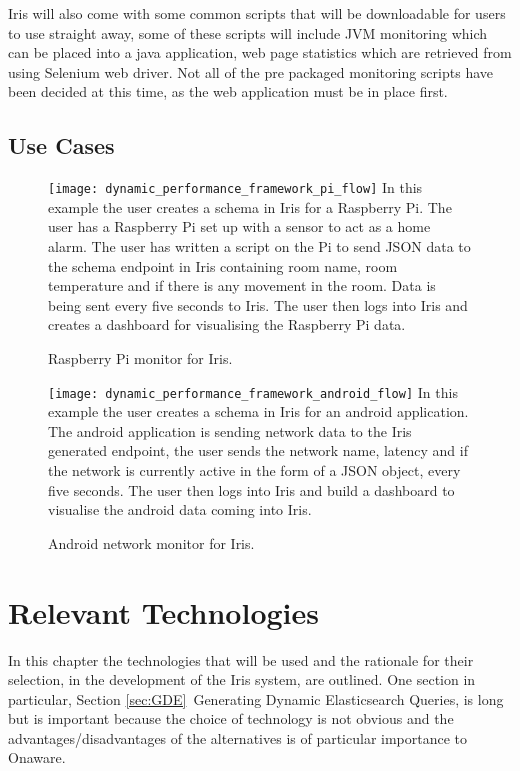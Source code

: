 \documentclass[12pt,a4paper,titlepage]{report}
\begin{document}
Iris will also come with some common scripts that will be downloadable for users to use straight away, some of these scripts will include JVM monitoring which can be placed into a java application, web page statistics which are retrieved from using Selenium web driver. Not all of the pre packaged monitoring scripts have been decided at this time, as the web application must be in place first.

\section{Use Cases}

\begin{figure}[H]
\begin{tcolorbox}
\texttt{[image: dynamic\_performance\_framework\_pi\_flow]}
In this example the user creates a schema in Iris for a Raspberry Pi. The user has a Raspberry Pi set up with a sensor to act as a home alarm. The user has written a script on the Pi to send JSON data to the schema endpoint in Iris containing room name, room temperature and if there is any movement in the room. Data is being sent every five seconds to Iris. The user then logs into Iris and creates a dashboard for visualising the Raspberry Pi data.
\end{tcolorbox}
\caption{Raspberry Pi monitor for Iris.}
\end{figure}

\begin{figure}[H]
\begin{tcolorbox}
\texttt{[image: dynamic\_performance\_framework\_android\_flow]}
In this example the user creates a schema in Iris for an android application. The android application is sending network data to the Iris generated endpoint, the user sends the network name, latency and if the network is currently active in the form of a JSON object, every five seconds. The user then logs into Iris and build a dashboard to visualise the android data coming into Iris.
\end{tcolorbox}
\caption{Android network monitor for Iris.}
\end{figure}

\chapter{Relevant Technologies}

In this chapter the technologies that will be used and the rationale for their selection, in the development of the Iris system, are outlined. One section in particular, Section \ref{sec:GDE}\ Generating Dynamic Elasticsearch Queries, is long but is important because the choice of technology is not obvious and the advantages/disadvantages of the alternatives is of particular importance to Onaware.
\end{document}
